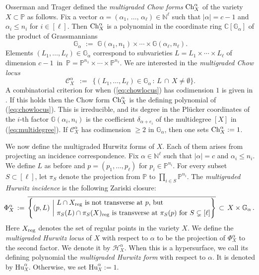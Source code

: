 \documentclass[12pt]{article}
\theoremstyle{definition}
\newcommand{\bC}{\mathbb C}
\newcommand{\bN}{\mathbb N}
\newcommand{\bG}{\mathbb G}
\newcommand{\bP}{\mathbb P}
\newcommand{\cH}{\mathcal H}
\begin{document}
Osserman and Trager \cite{OT} defined the {\em multigraded Chow forms} 
 ${\rm Ch}^\alpha_X$ of the variety $X \subset \bP$ as follows.
 Fix a vector $\alpha = (\alpha_1, \, \ldots, \, \alpha_\ell) \in \bN^\ell$ such that
 $|\alpha| = c-1$ and $\alpha_i \leq n_i$ for $i \in [\ell]$.
Then ${\rm Ch}^\alpha_X$ is a polynomial in the coordinate ring $\bC[\bG_\alpha]$ of
the product of Grassmannians
\begin{equation}
\label{eq:Gdef}
 \bG_\alpha \,\,:= \,\,\bG(\alpha_1, n_1) \times \cdots \times \bG(\alpha_\ell,n_\ell).
 \end{equation}
 Elements $ (L_1,\ldots,L_\ell) \in \bG_\alpha$ correspond to subvarieties  
 $L = L_1 \times \cdots \times L_\ell$ of dimension $c-1\,$ in $\,\bP = \bP^{n_1}  \times \cdots \times \bP^{n_\ell}$.
 We are interested in the {\em multigraded Chow locus}
\begin{equation}
\label{eq:chowlocus} \mathcal{C}^\alpha_X \,\,\, := \,\,\,
  \bigl\{ (L_1,\ldots,L_\ell) \in \bG_\alpha\,:\, L \,\cap \, X \not= \emptyset \bigr\}.
  \end{equation}
 A combinatorial criterion for when (\ref{eq:chowlocus}) has codimension $1$ is given in
 \cite[Theorem 1.2]{OT}.  If this holds then the Chow form
     ${\rm Ch}^\alpha_X$ is the defining polynomial of (\ref{eq:chowlocus}).
 This is irreducible, and its degree in the
 Pl\"ucker coordinates of the $i$-th factor $\bG(\alpha_i, n_i)$ is
 the coefficient $\delta_{\alpha+e_i}$ of the multidegree $[X]$ in (\ref{eq:multidegree}).
 If $ \mathcal{C}^\alpha_X$ has codimension $\geq 2$  in $\bG_\alpha$, then 
 one sets ${\rm Ch}^\alpha_X := 1$.

 \smallskip
 
We now define the multigraded Hurwitz forms of  $X$. 
Each of them arises from projecting
an incidence correspondence. Fix $\alpha \in \bN^\ell$ such that $|\alpha| = c$ and $\alpha_i \leq n_i$. 
We define $L$ as before and $p=(p_1, \ldots, p_\ell)$ for $p_i \in \bP^{n_i}$.
For every subset $S\subset  [\ell]$, let $\pi_S$ 
denote the projection from $\bP$ to $\prod_{i\in S}\bP^{n_i}$.
The \emph{multigraded Hurwitz incidence} is the following Zariski closure:
\begin{equation}\label{eq:hurwitzincidence} \!\!
    \Phi^\alpha_X \,:=\,  \overline{\left\{(p,L)\ \bigg|\ 
    \begin{aligned}
        &\text{$L\cap X_{\rm reg}$ is not transverse at $p$, but}\\
        &\text{$\pi_S(L)\cap\pi_S(X)_{\rm reg}$ is transverse at $\pi_S(p)$ for $S\subsetneq [\ell]$}
    \end{aligned}\right\}} \,\subset \,X \times \bG_\alpha\,.
\end{equation}
Here $X_{\rm reg}$ denotes the set of regular points in the variety $X$.
We define the \emph{multigraded Hurwitz locus} of $X$ with respect to $\alpha$ to be the projection of $\Phi^\alpha_X$ to the second factor. We denote it by $\cH_X^\alpha$.  When this is a hypersurface, we call its defining polynomial the \emph{multigraded Hurwitz form} with respect to $\alpha$.
It is denoted by $\mathrm{Hu}_X^\alpha$. Otherwise, we set $\mathrm{Hu}_X^\alpha:= 1.$ 
\end{document}
